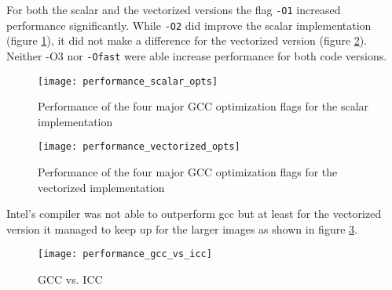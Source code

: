 For both the scalar and the vectorized versions the flag \texttt{-O1} increased
performance significantly. While \texttt{-O2} did improve the scalar
implementation (figure \ref{fig:perf_scal}), it did not make a difference for
the vectorized version (figure \ref{fig:perf_vec}). Neither \textsc{-O3} nor
\texttt{-Ofast} were able increase performance for both code versions.

\begin{figure}[h]
  \centering
  \texttt{[image: performance\_scalar\_opts]}
  \caption{Performance of the four major GCC optimization flags for the scalar implementation}
  \label{fig:perf_scal}
\end{figure}

\begin{figure}[h]
    \centering
    \texttt{[image: performance\_vectorized\_opts]}
    \caption{Performance of the four major GCC optimization flags for the vectorized implementation}
    \label{fig:perf_vec}
  \end{figure}



Intel's compiler was not able to outperform gcc but at least for the vectorized
version it managed to keep up for the larger images as shown in figure
\ref{fig:perf_gcc_vs_icc}.

\begin{figure}[h]
  \centering
  \texttt{[image: performance\_gcc\_vs\_icc]}
  \caption{GCC vs. ICC}
  \label{fig:perf_gcc_vs_icc}
\end{figure}

